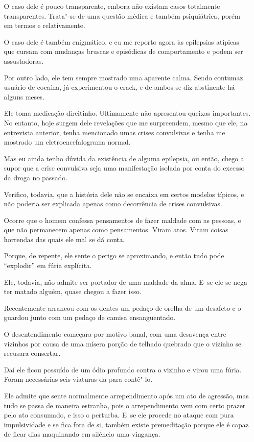  

O caso dele é pouco transparente, embora não existam casos totalmente
transparentes. Trata"-se de uma questão médica e também psiquiátrica,
porém em termos e relativamente.

O caso dele é também enigmático, e eu me reporto agora às epilepsias
atípicas que cursam com mudanças bruscas e episódicas de comportamento e
podem ser assustadoras.

Por outro lado, ele tem sempre mostrado uma aparente calma. Sendo
contumaz usuário de cocaína, já experimentou o crack, e de ambos se diz
abstinente há alguns meses.

Ele toma medicação direitinho. Ultimamente não apresentou queixas
importantes. No entanto, hoje surgem dele revelações que me surpreendem,
mesmo que ele, na entrevista anterior, tenha mencionado umas crises
convulsivas e tenha me mostrado um eletroencefalograma normal.

Mas eu ainda tenho dúvida da existência de alguma epilepsia, ou então,
chego a supor que a crise convulsiva seja uma manifestação isolada por
conta do excesso da droga no passado.

Verifico, todavia, que a história dele não se encaixa em certos modelos
típicos, e não poderia ser explicada apenas como decorrência de crises
convulsivas.

Ocorre que o homem confessa pensamentos de fazer maldade com as pessoas,
e que não permanecem apenas como pensamentos. Viram atos. Viram coisas
horrendas das quais ele mal se dá conta.

Porque, de repente, ele sente o perigo se aproximando, e então tudo pode
``explodir'' em fúria explícita.

Ele, todavia, não admite ser portador de uma maldade da alma. E~se ele
se nega ter matado alguém, quase chegou a fazer isso.

Recentemente arrancou com os dentes um pedaço de orelha de um desafeto e
o guardou junto com um pedaço de camisa ensanguentado.

O desentendimento começara por motivo banal, com uma desavença entre
vizinhos por causa de uma mísera porção de telhado quebrado que o
vizinho se recusara consertar.

Daí ele ficou possuído de um ódio profundo contra o vizinho e virou uma
fúria. Foram necessárias seis viaturas da  para contê"-lo.

Ele admite que sente normalmente arrependimento após um ato de agressão,
mas tudo se passa de maneira estranha, pois o arrependimento vem com
certo prazer pelo ato consumado, e isso o perturba. E~se ele procede no
ataque com pura impulsividade e se fica fora de si, também existe
premeditação porque ele é capaz de ficar dias maquinando em silêncio uma
vingança.

